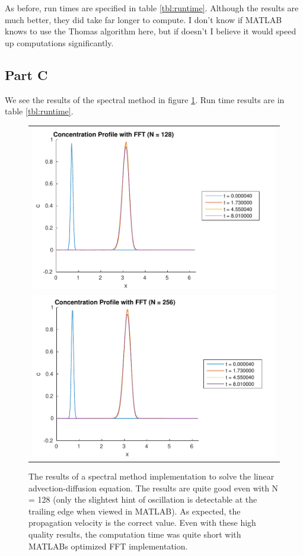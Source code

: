 \documentclass{article}
\begin{document}
As before, run times are specified in table \ref{tbl:runtime}.
Although the results are much better, they did take far longer to compute.
I don't know if MATLAB knows to use the Thomas algorithm here, but if doesn't I believe it would speed up computations significantly.

\clearpage
\subsection{Part C}
We see the results of the spectral method in figure \ref{fig:spectral}. Run time results are in table \ref{tbl:runtime}.

\begin{figure}[!ht]
\centering
\begin{tabular}{c}
\includegraphics[scale=0.8]{p2c_128.pdf} \\
\includegraphics[scale=0.8]{p2c_256.pdf}
\end{tabular}
\caption{The results of a spectral method implementation to solve the linear advection-diffusion equation.
The results are quite good even with N = 128 (only the slightest hint of oscillation is detectable at the trailing edge when viewed in MATLAB).
As expected, the propagation velocity is the correct value.
Even with these high quality results, the computation time was quite short with MATLABs optimized FFT implementation.
}
\label{fig:spectral}
\end{figure}
\end{document}
